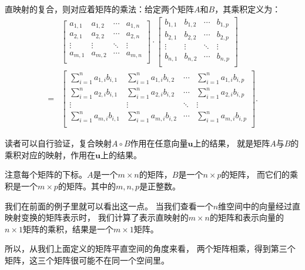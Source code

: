 \documentclass[12pt,UTF8,fontset=none]{ctexbook}
\begin{document}
直映射的复合，则对应着矩阵的乘法：给定两个矩阵$A$和$B$，其乘积定义为：
\begin{align*}
& \begin{bmatrix}
    a_{1,1}    & a_{1,2}   & \cdots & a_{1,n} \\
    a_{2,1}    & a_{2,2}   & \cdots & a_{2,n} \\
    \vdots     & \vdots    & \ddots & \vdots  \\
    a_{m,1}    & a_{m,2}   & \cdots & a_{m,n} \\
   \end{bmatrix} \cdot 
   \begin{bmatrix}
    b_{1,1}     & b_{1,2}   & \cdots & b_{1,p} \\
    b_{2,1}     & b_{2,2}   & \cdots & b_{2,p} \\
    \vdots      & \vdots    & \ddots & \vdots  \\
    b_{n,1}     & b_{n,2}   & \cdots & b_{n,p} \\
\end{bmatrix}  \\
    =&\begin{bmatrix}
        \sum_{i=1}^n a_{1,i} b_{i,1}     & \sum_{i=1}^n a_{1,i} b_{i,2}   & \cdots & \sum_{i=1}^n a_{1,i} b_{i,p} \\
        \sum_{i=1}^n a_{2,i} b_{i,1}     & \sum_{i=1}^n a_{2,i} b_{i,2}   & \cdots & \sum_{i=1}^n a_{2,i} b_{i,p} \\
        \vdots      & \vdots    & \ddots & \vdots  \\
        \sum_{i=1}^n a_{m,i} b_{i,1}     & \sum_{i=1}^n a_{m,i} b_{i,2}   & \cdots & \sum_{i=1}^n a_{m,i} b_{i,p} \\
    \end{bmatrix}. 
\end{align*}

读者可以自行验证，复合映射$A\circ B$作用在任意向量$\mathbf{u}$上的结果，
就是矩阵$A$与$B$的乘积对应的映射，作用在$\mathbf{u}$上的结果。

注意每个矩阵的下标。$A$是一个$m\times n$的矩阵，$B$是一个$n\times p$的矩阵，
而它们的乘积是一个$m\times p$的矩阵。其中的$m,n,p$是正整数。

我们在前面的例子里就可以看出这一点。
当我们查看一个$n$维空间中的向量经过直映射变换的矩阵表示时，
我们计算了表示直映射的$m\times n$的矩阵和表示向量的$n\times 1$矩阵的乘积，结果是一个$m\times 1$矩阵。

所以，从我们上面定义的矩阵平直空间的角度来看，
两个矩阵相乘，得到第三个矩阵，这三个矩阵很可能不在同一个空间里。
\end{document}
